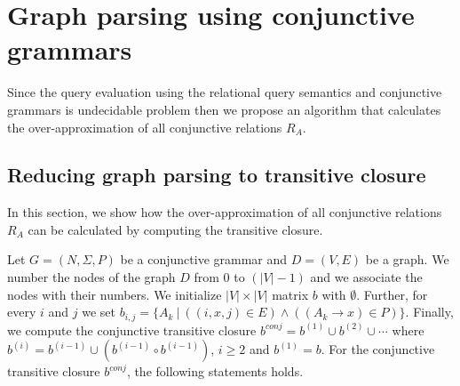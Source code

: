 \section{Graph parsing using conjunctive grammars}
Since the query evaluation using the relational query semantics and conjunctive grammars is undecidable problem then we propose an algorithm that calculates the over-approximation of all conjunctive relations $R_A$.

\subsection{Reducing graph parsing to transitive closure} \label{section_reducing_conj}
In this section, we show how the over-approximation of all conjunctive relations $R_A$ can be calculated by computing the transitive closure.

Let $G = (N,\Sigma,P)$ be a conjunctive grammar and $D = (V, E)$ be a graph. We number the nodes of the graph $D$ from 0 to $(|V| - 1)$ and we associate the nodes with their numbers. We initialize $|V| \times |V|$ matrix $b$ with $\emptyset$. Further, for every $i$ and $j$ we set $b_{i,j} = \{A_k~|~((i,x,j) \in E) \wedge ((A_k \rightarrow x) \in P)\}$. Finally, we compute the conjunctive transitive closure $b^{conj} = b^{(1)} \cup b^{(2)} \cup \cdots$ where $b^{(i)} = b^{(i-1)} \cup (b^{(i-1)} \circ b^{(i-1)})$, $i \ge 2$ and $b^{(1)} = b$. For the conjunctive transitive closure $b^{conj}$, the following statements holds.

